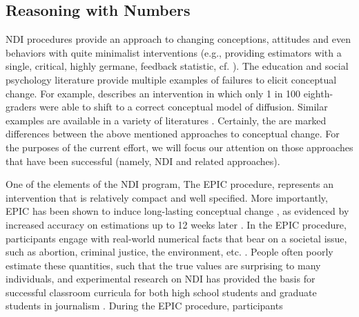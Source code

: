 
\subsection{Reasoning with Numbers \label{sec:ndi}}


NDI procedures \cite[introduced by][]{ranney_numerically_2001_fixed} provide an
approach to changing conceptions, attitudes and even behaviors with quite
minimalist interventions (e.g., providing estimators with a single, critical,
highly germane, feedback statistic, cf. ).  The
education and social psychology literature provide multiple examples of failures
to elicit conceptual change. For example, \citeauthor{chi_commonsense_2005} describes
an intervention in which only 1 in 100 eighth-graders were able to shift to a
correct conceptual model of diffusion. Similar examples are available in a
variety of literatures \cite[cf.][]{disessa_what_1998, lord_biased_1979}.
Certainly, the are marked differences between the above mentioned approaches to
conceptual change. For the purposes of the current effort, we will focus our
attention on those approaches that have been successful (namely, NDI and related
approaches).

One of the elements of the NDI program, The EPIC procedure, represents an
intervention that is relatively compact and well specified. More importantly,
EPIC has been shown to induce long-lasting conceptual change
\cite[e.g.,][]{ranney_designing_2008}, as evidenced by increased accuracy on estimations
up to 12 weeks later \cite{munnich_longevities_2005}.  In the EPIC procedure,
participants engage with real-world numerical facts that bear on a societal
issue, such as abortion, criminal justice, the environment, etc.
\cite[e.g.,][]{garcia_de_osuna_qualitative_2004_fixed,munnich_policy_2003_fixed}.  
People often poorly
estimate these quantities, such that the true values are surprising to many
individuals, and experimental research on NDI has provided the basis for
successful classroom curricula for both high school students and graduate
students in journalism
\cite{munnich_numerically-driven_2004,ranney_designing_2008}.  During the EPIC
procedure, participants

